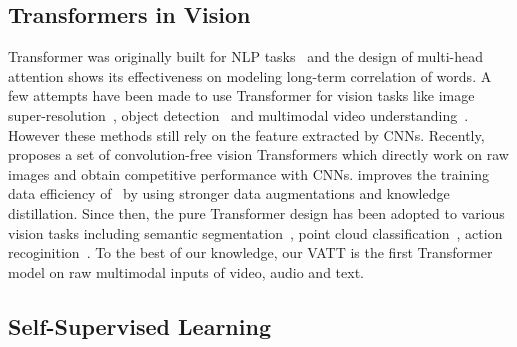 \documentclass[10pt,twocolumn,letterpaper]{article}
\newcommand{\ours}{VATT\xspace}
\begin{document}
\subsection{Transformers in Vision}
Transformer was originally built for NLP tasks~\cite{vaswani2017attention} and the design of multi-head attention shows its effectiveness on modeling long-term correlation of words. A few attempts have been made to use Transformer for vision tasks like image super-resolution~\cite{yang2020learning}, object detection~\cite{carion2020end} and multimodal video understanding~\cite{sun2019learning, chen2020uniter, luo2020univilm}. However these methods still rely on the feature extracted by CNNs.  Recently, \cite{dosovitskiy2021an} proposes a set of convolution-free vision Transformers which directly work on raw images and obtain competitive performance with CNNs. \cite{touvron2020training} improves the training data efficiency of~\cite{dosovitskiy2021an} by using stronger data augmentations and knowledge distillation. Since then, the pure Transformer design has been adopted to various vision tasks including semantic segmentation~\cite{zheng2020rethinking}, point cloud classification~\cite{zhao2020point}, action recoginition~\cite{bertasius2021space,sharir2021image,vivit}. To the best of our knowledge, our \ours is the first Transformer model on raw multimodal inputs of video, audio and text.

\subsection{Self-Supervised Learning}
\end{document}
